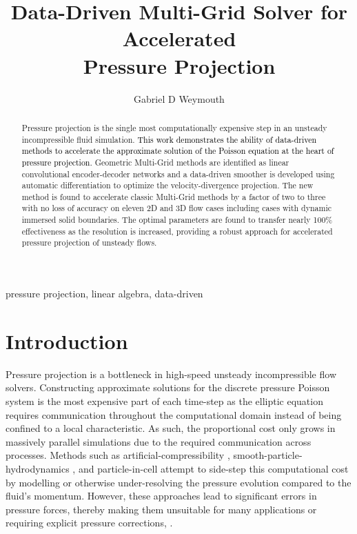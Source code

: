 \documentclass[]{elsarticle}
\begin{document}
\begin{frontmatter}

\title{Data-Driven Multi-Grid Solver for Accelerated \\ Pressure Projection}

\author{Gabriel D Weymouth}
\address{Engineering and Physical Sciences, University of Southampton, Southampton, UK}
\address{Data-Centric Engineering, Alan Turing Institute, London, UK}

\begin{abstract}
Pressure projection is the single most computationally expensive step in an unsteady incompressible fluid simulation. \textcolor{black}{This work demonstrates the ability of data-driven methods to accelerate the approximate solution of the Poisson equation at the heart of pressure projection.} Geometric Multi-Grid methods are identified as linear convolutional encoder-decoder networks and a data-driven smoother is developed using automatic differentiation to optimize the velocity-divergence projection. The new method is found to accelerate classic Multi-Grid methods by a factor of two to three with no loss of accuracy on eleven 2D and 3D flow cases including cases with dynamic immersed solid boundaries. The optimal parameters are found to transfer nearly 100\% effectiveness as the resolution is increased, providing a robust approach for accelerated pressure projection of unsteady flows.
\end{abstract}

\begin{keyword}
pressure projection, linear algebra, data-driven
\end{keyword}

\end{frontmatter}

\section{Introduction}

Pressure projection is a bottleneck in high-speed unsteady incompressible flow solvers. Constructing approximate solutions for the discrete pressure Poisson system is the most expensive part of each time-step as the elliptic equation requires communication throughout the computational domain instead of being confined to a local characteristic. As such, the proportional cost only grows in massively parallel simulations due to the required communication across processes. Methods such as artificial-compressibility \cite{he2002comparison}, smooth-particle-hydrodynamics \cite{kiara2013sph}, and particle-in-cell \cite{jiang2017angular} attempt to side-step this computational cost by modelling or otherwise under-resolving the pressure evolution compared to the fluid's momentum. However, these approaches lead to significant errors in pressure forces, thereby making them unsuitable for many applications or requiring explicit pressure corrections, \cite{kiara2013sph}.
\end{document}

